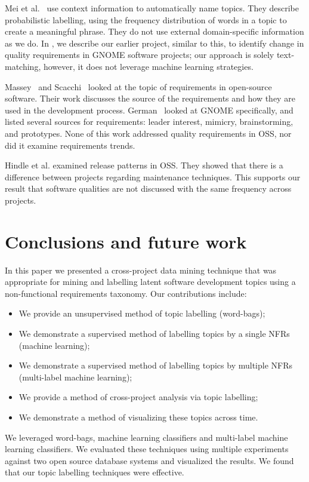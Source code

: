 \documentclass[]{sig-alternate}
\begin{document}
Mei et al.~\cite{Mei2007} use context information to automatically name topics. They describe probabilistic labelling, using the frequency distribution of words in a topic to create a meaningful phrase. They do not use external domain-specific information as we do.
In \cite{ernst10refsq}, we describe our earlier project, similar to this, to identify change in quality requirements in GNOME software projects; our approach is solely text-matching, however, it does not leverage machine learning strategies.

Massey~\cite{massey02icse} and Scacchi~\cite{scacchi02,scacchi05b} looked at the topic of requirements in open-source software. Their work discusses the source of the requirements and how they are used in the development process. German~\cite{german03gnome} looked at GNOME specifically, and listed several sources for requirements: leader interest, mimicry, brainstorming, and prototypes. None of this work  addressed quality requirements in OSS, nor did it examine requirements trends.

Hindle et al. \cite{Hindle2007} examined release patterns in OSS. They showed that there is a difference between projects regarding maintenance techniques. This supports our result that software qualities are not discussed with the same frequency across projects.


\section{Conclusions and future work}


In this paper we presented a cross-project data mining technique that was appropriate for mining and labelling latent software development topics using a non-functional requirements taxonomy. %
Our contributions include:
\begin{itemize}
\item We provide an unsupervised method of topic labelling (word-bags);
\item We demonstrate a supervised method of labelling topics by a single NFRs (machine learning);
\item We demonstrate a supervised method of labelling topics by multiple NFRs (multi-label machine learning);
\item We provide a method of cross-project analysis via topic labelling;
\item We demonstrate a method of visualizing these topics across time.
\end{itemize}
We leveraged word-bags, machine learning classifiers and multi-label machine learning classifiers.  
We evaluated these techniques using multiple experiments against two open source database systems and visualized the results.
We found that our topic labelling techniques were effective.
\end{document}
